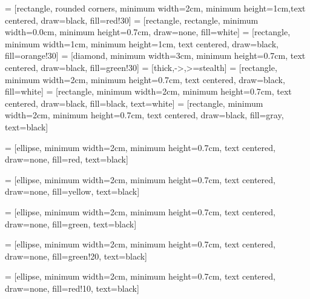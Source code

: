 
\usepackage{tikz}
\usetikzlibrary{shapes.geometric, arrows}
 = [rectangle, rounded corners, minimum width=2cm, minimum height=1cm,text centered, draw=black, fill=red!30]
 = [rectangle, rectangle, minimum width=0.0cm, minimum height=0.7cm, draw=none, fill=white]
 = [rectangle, minimum width=1cm, minimum height=1cm, text centered, draw=black, fill=orange!30]
 = [diamond, minimum width=3cm, minimum height=0.7cm, text centered, draw=black, fill=green!30]
 = [thick,->,>=stealth]
 = [rectangle, minimum width=2cm, minimum height=0.7cm, text centered, draw=black, fill=white]
 = [rectangle, minimum width=2cm, minimum height=0.7cm, text centered, draw=black, fill=black, text=white]
 = [rectangle, minimum width=2cm, minimum height=0.7cm, text centered, draw=black, fill=gray, text=black]

 = [ellipse, minimum width=2cm, minimum height=0.7cm, text centered, draw=none, fill=red, text=black]

 = [ellipse, minimum width=2cm, minimum height=0.7cm, text centered, draw=none, fill=yellow, text=black]

 = [ellipse, minimum width=2cm, minimum height=0.7cm, text centered, draw=none, fill=green, text=black]

 = [ellipse, minimum width=2cm, minimum height=0.7cm, text centered, draw=none, fill=green!20, text=black]

 = [ellipse, minimum width=2cm, minimum height=0.7cm, text centered, draw=none, fill=red!10, text=black]

